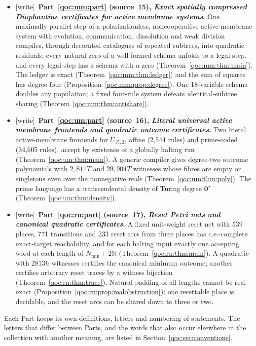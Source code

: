 \documentclass[11pt,letterpaper]{article}
\theoremstyle{definition}
\theoremstyle{remark}
\newcommand{\N}{\mathbb N}
\newcommand{\wtag}{\textup{[write]}}
\begin{document}
\begin{itemize}
\item \wtag\ \textbf{Part~\ref{qoc:mm:part} (source~15), \emph{Exact spatially compressed Diophantine certificates for active membrane systems}.} One maximally parallel step of a polarizationless, noncooperative active-membrane system with evolution, communication, dissolution and weak division compiles, through decorated catalogues of repeated subtrees, into quadratic residuals: every natural zero of a well-formed schema unfolds to a legal step, and every legal step has a schema with a zero (Theorem~\ref{qoc:mm:thm:main}). The ledger is exact (Theorem~\ref{qoc:mm:thm:ledger}) and the sum of squares has degree four (Proposition~\ref{qoc:mm:prop:degree}). One 18-variable schema doubles any population; a fixed four-rule system defeats identical-subtree sharing (Theorem~\ref{qoc:mm:thm:antishare}).
\item \wtag\ \textbf{Part~\ref{qoc:um:part} (source~16), \emph{Literal universal active membrane frontends and quadratic outcome certificates}.} Two literal active-membrane frontends for $U_{15,2}$, affine (2,544 rules) and prime-coded (34,605 rules), accept by existence of a globally halting run (Theorem~\ref{qoc:um:thm:main}). A generic compiler gives degree-two outcome polynomials with $2{,}811T$ and $29{,}904T$ witnesses whose fibres are empty or singletons even over the nonnegative reals (Theorem~\ref{qoc:um:thm:poly}). The prime language has a transcendental density of Turing degree $\mathbf0'$ (Theorem~\ref{qoc:um:thm:density}).
\item \wtag\ \textbf{Part~\ref{qoc:rn:part} (source~17), \emph{Reset Petri nets and canonical quadratic certificates}.} A fixed unit-weight reset net with 539 places, 771 transitions and 233 reset arcs from three places has c.e.-complete exact-target reachability, and for each halting input exactly one accepting word at each length of $N_{\min}+2\N$ (Theorem~\ref{qoc:rn:thm:main}). A quadratic with $2813h$ witnesses certifies the canonical minimum outcome; another certifies arbitrary reset traces by a witness bijection (Theorem~\ref{qoc:rn:thm:trace}). Natural padding of all lengths cannot be real-exact (Proposition~\ref{qoc:rn:prop:realobstruction}); one resettable place is decidable, and the reset arcs can be shared down to three or two.
\end{itemize}

Each Part keeps its own definitions, letters and numbering of statements. The letters that differ between Parts, and the words that also occur elsewhere in the collection with another meaning, are listed in Section~\ref{qoc:sec:conventions}.
\end{document}
